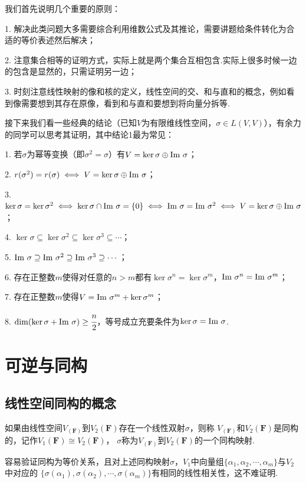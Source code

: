 我们首先说明几个重要的原则：

1. 解决此类问题大多需要综合利用维数公式及其推论，需要讲题给条件转化为合适的等价表述然后解决；

2. 注意集合相等的证明方式，实际上就是两个集合互相包含.实际上很多时候一边的包含是显然的，只需证明另一边；

3. 时刻注意线性映射的像和核的定义，线性空间的交、和与直和的概念，例如看到像需要想到其存在原像，看到和与直和要想到将向量分拆等.

接下来我们看一些经典的结论（已知$V$为有限维线性空间，$\sigma\in L(V,V)$），有余力的同学可以思考其证明，其中结论1最为常见：

1. 若$\sigma$为幂等变换（即$\sigma^2=\sigma$）有$V=\ker\sigma\oplus\textup{Im }\sigma$；

2. $r(\sigma^2)=r(\sigma) \iff V=\ker\sigma\oplus\textup{Im }\sigma$；

3. $\ker\sigma=\ker\sigma^2 \iff \ker\sigma \cap \textup{Im }\sigma=\{0\} \iff \textup{Im }\sigma=\textup{Im }\sigma^2 \iff V=\ker\sigma\oplus \textup{Im }\sigma$；

4. $\ker\sigma \subseteq \ker\sigma^2 \subseteq \ker\sigma^3 \subseteq \cdots$；

5. $\textup{Im }\sigma \supseteq \textup{Im }\sigma^2 \supseteq \textup{Im }\sigma^3 \supseteq \cdots$；

6. 存在正整数$m$使得对任意的$n>m$都有$\ker\sigma^n=\ker\sigma^m$，$\textup{Im }\sigma^n=\textup{Im }\sigma^m$；

7. 存在正整数$m$使得$V=\textup{Im }\sigma^m+\ker\sigma^m$；

8. $\dim(\ker\sigma+\textup{Im }\sigma) \ge \cfrac{n}{2}$，等号成立充要条件为$\ker\sigma=\textup{Im }\sigma$.

\section{可逆与同构}
\subsection{线性空间同构的概念}
\begin{definition}
	如果由线性空间$V_(\mathbf{F})$到$V_2(\mathbf{F})$存在一个线性双射$\sigma$，则称
	$V_(\mathbf{F})$和$V_2(\mathbf{F})$是同构的，记作$V_1(\mathbf{F}) \cong V_2(\mathbf{F})$，
	$\sigma$称为$V_(\mathbf{F})$到$V_2(\mathbf{F})$的一个同构映射.
\end{definition}
容易验证同构为等价关系，且对上述同构映射$\sigma$，$V_1$中向量组$\{\alpha_1,\alpha_2,\cdots,\alpha_m\}$与$V_2$中对应的
$\{\sigma(\alpha_1),\sigma(\alpha_2),\cdots,\sigma(\alpha_m)\}$有相同的线性相关性，这不难证明.

